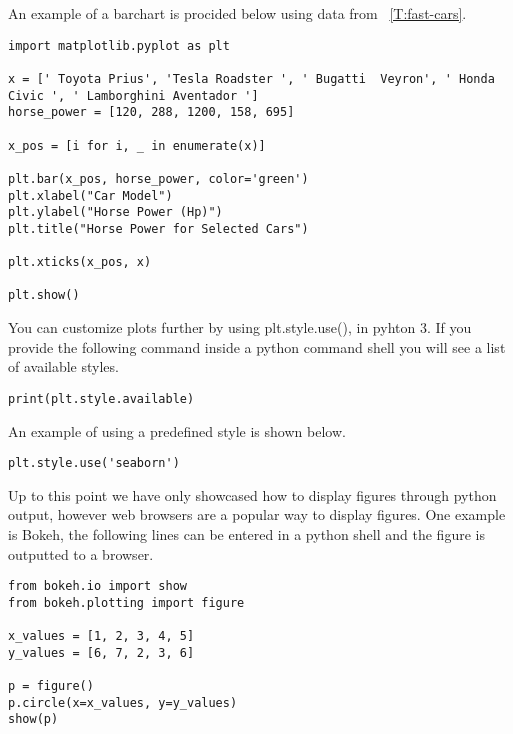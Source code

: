 An example of a barchart is procided below using data from
~\ref{T:fast-cars}. 

\begin{lstlisting}
import matplotlib.pyplot as plt

x = [' Toyota Prius', 'Tesla Roadster ', ' Bugatti  Veyron', ' Honda Civic ', ' Lamborghini Aventador ']
horse_power = [120, 288, 1200, 158, 695]

x_pos = [i for i, _ in enumerate(x)]

plt.bar(x_pos, horse_power, color='green')
plt.xlabel("Car Model")
plt.ylabel("Horse Power (Hp)")
plt.title("Horse Power for Selected Cars")

plt.xticks(x_pos, x)

plt.show()
\end{lstlisting}

You can customize plots further by using plt.style.use(), in pyhton
3. If you provide the following command inside a python command shell
you will see a list of available styles.

\begin{lstlisting}
print(plt.style.available)
\end{lstlisting}
 
An example of using a predefined style is shown below. 

\begin{lstlisting}
plt.style.use('seaborn')
\end{lstlisting}

Up to this point we have only showcased how to display figures through
python output, however web browsers are a popular way to display
figures. One example is Bokeh, the following lines can be entered in a
python shell and the figure is outputted to a browser. 

\begin{lstlisting}
from bokeh.io import show
from bokeh.plotting import figure

x_values = [1, 2, 3, 4, 5]
y_values = [6, 7, 2, 3, 6]

p = figure()
p.circle(x=x_values, y=y_values)
show(p)
\end{lstlisting}
